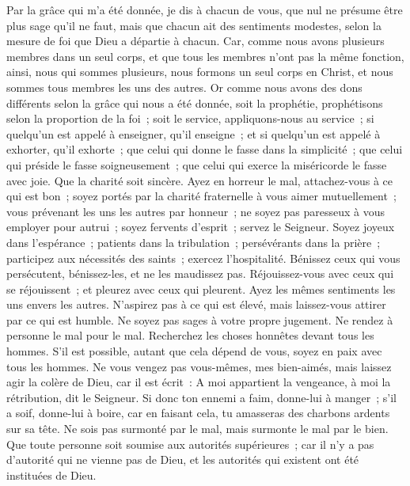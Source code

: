\begin{multicols}{2}
Par la grâce qui m'a été donnée, je dis à chacun de vous, que nul ne présume être plus sage qu'il ne faut, mais que chacun ait des sentiments modestes, selon la mesure de foi que Dieu a départie à chacun.
Car, comme nous avons plusieurs membres dans un seul corps, et que tous les membres n'ont pas la même fonction,
ainsi, nous qui sommes plusieurs, nous formons un seul corps en Christ, et nous sommes tous membres les uns des autres.
Or comme nous avons des dons différents selon la grâce qui nous a été donnée, soit la prophétie, prophétisons selon la proportion de la foi~;
soit le service, appliquons-nous au service~; si quelqu'un est appelé à enseigner, qu'il enseigne~;
et si quelqu'un est appelé à exhorter, qu'il exhorte~; que celui qui donne le fasse dans la simplicité~; que celui qui préside le fasse soigneusement~; que celui qui exerce la miséricorde le fasse avec joie.
Que la charité soit sincère. Ayez en horreur le mal, attachez-vous à ce qui est bon~;
soyez portés par la charité fraternelle à vous aimer mutuellement~; vous prévenant les uns les autres par honneur~;
ne soyez pas paresseux à vous employer pour autrui~; soyez fervents d'esprit~; servez le Seigneur.
Soyez joyeux dans l'espérance~; patients dans la tribulation~; persévérants dans la prière~;
participez aux nécessités des saints~; exercez l'hospitalité.
Bénissez ceux qui vous persécutent, bénissez-les, et ne les maudissez pas.
Réjouissez-vous avec ceux qui se réjouissent~; et pleurez avec ceux qui pleurent.
Ayez les mêmes sentiments les uns envers les autres. N'aspirez pas à ce qui est élevé, mais laissez-vous attirer par ce qui est humble. Ne soyez pas sages à votre propre jugement.
Ne rendez à personne le mal pour le mal. Recherchez les choses honnêtes devant tous les hommes.
S'il est possible, autant que cela dépend de vous, soyez en paix avec tous les hommes.
Ne vous vengez pas vous-mêmes, mes bien-aimés, mais laissez agir la colère de Dieu, car il est écrit~: A moi appartient la vengeance, à moi la rétribution, dit le Seigneur.
Si donc ton ennemi a faim, donne-lui à manger~; s'il a soif, donne-lui à boire, car en faisant cela, tu amasseras des charbons ardents sur sa tête.
Ne sois pas surmonté par le mal, mais surmonte le mal par le bien.
\VerseOne{}Que toute personne soit soumise aux autorités supérieures~; car il n'y a pas d'autorité qui ne vienne pas de Dieu, et les autorités qui existent ont été instituées de Dieu.

\end{multicols}
